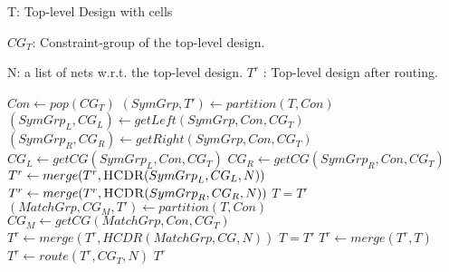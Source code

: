   \renewcommand{\algorithmicrequire}{\textbf{Input:}}
  \renewcommand{\algorithmicensure}{\textbf{Output:}}
  \renewcommand{\algorithmiccomment}[1]{// #1}
  \newcommand{\HCDR}{\ensuremath{\mbox{\sc HCDR}}}
  \begin{algorithm}[t]
  \caption{$\HCDR(T,CG_T,N)$}\label{alg:HCDR}
  \begin{algorithmic}[1]
  \REQUIRE T: Top-level Design with cells 

  $CG_T$: Constraint-group of the top-level design.

  N: a list of nets w.r.t. the top-level design.
  \ENSURE $T^r$ : Top-level design after routing.
  \medskip

    \STATE $Con \gets pop(CG_T) $
      \STATE $(SymGrp,T') \gets partition(T,Con)$
      \STATE $({SymGrp}_L,CG_L) \gets getLeft(SymGrp,Con,CG_T)$
      \STATE $({SymGrp}_R,CG_R) \gets getRight(SymGrp,Con,CG_T)$
      \STATE ${CG}_L \gets getCG({SymGrp}_L,Con,CG_T)$
      \STATE ${CG}_R \gets getCG({SymGrp}_R,Con,CG_T)$
      \STATE $T^r \gets merge(T^r,\HCDR({SymGrp}_L,CG_L,N))$
      \STATE $T^r \gets merge(T^r,\HCDR({SymGrp}_R,CG_R,N))$
      \STATE $T = T'$
      \STATE $(MatchGrp,CG_M,T') \gets partition(T,Con)$
      \STATE $CG_M \gets getCG(MatchGrp,Con,CG_T)$
      \STATE $T^r \gets merge(T^r,HCDR(MatchGrp,CG,N))$
      \STATE $T = T'$
    \ENDIF
  \ENDWHILE
  \STATE $T^r \gets merge(T^r,T)$
  \STATE $T^r \gets route(T^r,CG_T,N)$
  \RETURN $T^r$ 
  \end{algorithmic}
  \end{algorithm}

